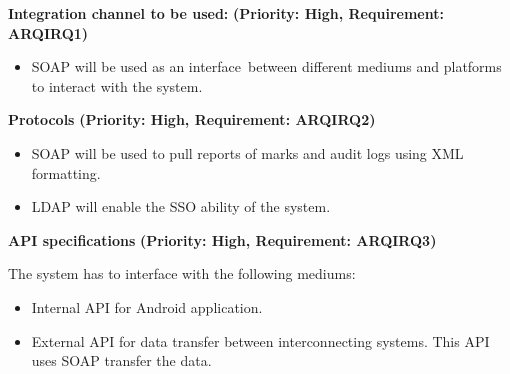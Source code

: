 \documentclass[12pt]{article}
\begin{document}
		\vspace{0.2in}

		\begin{flushleft}
			\textbf{Integration channel to be used:}
			\newline\textbf{(Priority: High, Requirement: ARQIRQ1)} 
		\end{flushleft}

			\vspace{0.05in} 
			\begin{itemize} 
				\item SOAP will be used as an interface\
				 between different mediums and platforms to interact with the system.
			\end{itemize} 

			\vspace{0.15in}

		\newpage
		
		\begin{flushleft}
				\textbf{Protocols}
				\newline\textbf{(Priority: High, Requirement: ARQIRQ2)} 
		\end{flushleft}
			
			\vspace{0.05in} 

			\begin{itemize}
				\item SOAP will be used to pull reports of marks and audit logs using XML formatting.
				\item LDAP will enable the SSO ability of the system.
			\end{itemize}

			\vspace{0.15in}

		\begin{flushleft}
			\textbf{API specifications}
			\newline\textbf{(Priority: High, Requirement: ARQIRQ3)}
		\end{flushleft}
		
			\vspace{0.05in}
			
			The system has to interface with the following mediums:
			\begin{itemize}
				\item Internal API for Android application.
				\item External API for data transfer between interconnecting systems. This API uses SOAP
				transfer the data.
			\end{itemize}
			
\end{document}
